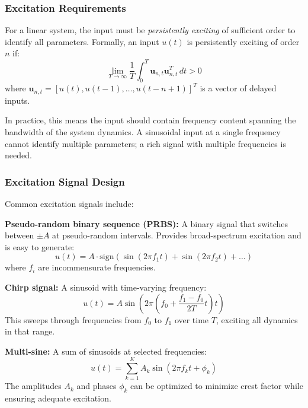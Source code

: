 \subsubsection{Excitation Requirements}

For a linear system, the input must be \textit{persistently exciting} of sufficient order to identify all parameters. Formally, an input $u(t)$ is persistently exciting of order $n$ if:
\begin{equation}
\lim_{T \to \infty} \frac{1}{T} \int_0^T \mathbf{u}_{n,t} \mathbf{u}_{n,t}^T \, dt > 0
\label{eq:persistent_excitation}
\end{equation}
where $\mathbf{u}_{n,t} = [u(t), u(t-1), \ldots, u(t-n+1)]^T$ is a vector of delayed inputs.

In practice, this means the input should contain frequency content spanning the bandwidth of the system dynamics. A sinusoidal input at a single frequency cannot identify multiple parameters; a rich signal with multiple frequencies is needed.

\subsubsection{Excitation Signal Design}

Common excitation signals include:

\textbf{Pseudo-random binary sequence (PRBS):} A binary signal that switches between $\pm A$ at pseudo-random intervals. Provides broad-spectrum excitation and is easy to generate:
\begin{equation}
u(t) = A \cdot \text{sign}(\sin(2\pi f_1 t) + \sin(2\pi f_2 t) + \ldots)
\end{equation}
where $f_i$ are incommensurate frequencies.

\textbf{Chirp signal:} A sinusoid with time-varying frequency:
\begin{equation}
u(t) = A \sin\left(2\pi \left(f_0 + \frac{f_1 - f_0}{2T}t\right)t\right)
\end{equation}
This sweeps through frequencies from $f_0$ to $f_1$ over time $T$, exciting all dynamics in that range.

\textbf{Multi-sine:} A sum of sinusoids at selected frequencies:
\begin{equation}
u(t) = \sum_{k=1}^{K} A_k \sin(2\pi f_k t + \phi_k)
\end{equation}
The amplitudes $A_k$ and phases $\phi_k$ can be optimized to minimize crest factor while ensuring adequate excitation.

